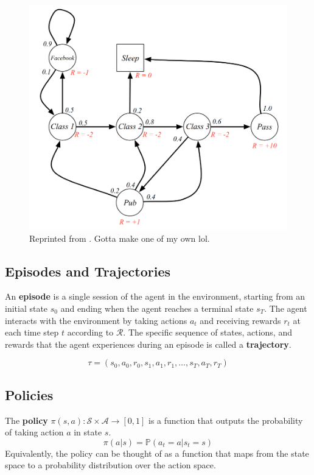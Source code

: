 \documentclass[12pt]{report}
\theoremstyle{definition}
\theoremstyle{remark}
\begin{document}
\begin{figure}[h]
    \centering
    \includegraphics[width=0.7\linewidth]{figs/mdp.png}
    \caption{Reprinted from \cite{silver_lecture_nodate}. Gotta make one of my own lol.}
    \label{fig:enter-label}
\end{figure}

\subsection{Episodes and Trajectories}
An \textbf{episode} is a single session of the agent in the environment, starting from an initial state $s_0$ and ending when the agent reaches a terminal state $s_T$. The agent interacts with the environment by taking actions $a_t$ and receiving rewards $r_t$ at each time step $t$ according to $\mathcal{R}$. The specific sequence of states, actions, and rewards that the agent experiences during an episode is called a \textbf{trajectory}.

\begin{equation}
    \tau = (s_0, a_0, r_0, s_1, a_1, r_1, \ldots, s_T, a_T, r_T)
\end{equation}

\subsection{Policies}

The \textbf{policy} $\pi(s, a): \mathcal{S} \times \mathcal{A} \to [0,1]$ is a function that outputs the probability of taking action $a$ in state $s$.
\begin{equation}
    \pi(a | s) = \mathbb{P}(a_t = a | s_t = s)
\end{equation}
Equivalently, the policy can be thought of as a function that maps from the state space to a probability distribution over the action space.
\end{document}
